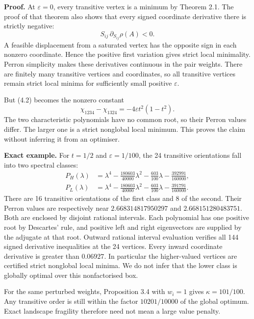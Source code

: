 \documentclass[
  11pt,
  a4paper,
]{article}
\begin{document}
\textbf{Proof.} At \(\varepsilon=0\), every transitive vertex is a
minimum by Theorem 2.1. The proof of that theorem also shows that every
signed coordinate derivative there is strictly negative:
\[S_{ij}\,\partial_{S_{ij}}\rho(A)<0.\] A feasible displacement from a
saturated vertex has the opposite sign in each nonzero coordinate. Hence
the positive first variation gives strict local minimality. Perron
simplicity makes these derivatives continuous in the pair weights. There
are finitely many transitive vertices and coordinates, so all transitive
vertices remain strict local minima for sufficiently small positive
\(\varepsilon\).

But (4.2) becomes the nonzero constant
\[\chi_{1234}-\chi_{1324}=-4\varepsilon t^2(1-t^2).           \tag{4.3}\]
The two characteristic polynomials have no common root, so their Perron
values differ. The larger one is a strict nonglobal local minimum. This
proves the claim without inferring it from an optimiser.

\textbf{Exact example.} For \(t=1/2\) and \(\varepsilon=1/100\), the 24
transitive orientations fall into two spectral classes: \[
\begin{aligned}
 P_H(\lambda)&=\lambda^4-\frac{180603}{40000}\lambda^2
                      -\frac{603}{100}\lambda-\frac{392991}{160000},\\
 P_L(\lambda)&=\lambda^4-\frac{180603}{40000}\lambda^2
                      -\frac{603}{100}\lambda-\frac{391791}{160000}.
\end{aligned}                                               \tag{4.4}
\] There are 16 transitive orientations of the first class and 8 of the
second. Their Perron values are respectively near \(2.668314817950297\)
and \(2.668151280483751\). Both are enclosed by disjoint rational
intervals. Each polynomial has one positive root by Descartes' rule, and
positive left and right eigenvectors are supplied by the adjugate at
that root. Outward rational interval evaluation verifies all 144 signed
derivative inequalities at the 24 vertices. Every inward coordinate
derivative is greater than \(0.06927\). In particular the higher-valued
vertices are certified strict nonglobal local minima. We do not infer
that the lower class is globally optimal over this nonfactorised box.

For the same perturbed weights, Proposition 3.4 with \(w_i=1\) gives
\(\kappa=101/100\). Any transitive order is still within the factor
\(10201/10000\) of the global optimum. Exact landscape fragility
therefore need not mean a large value penalty.
\end{document}
